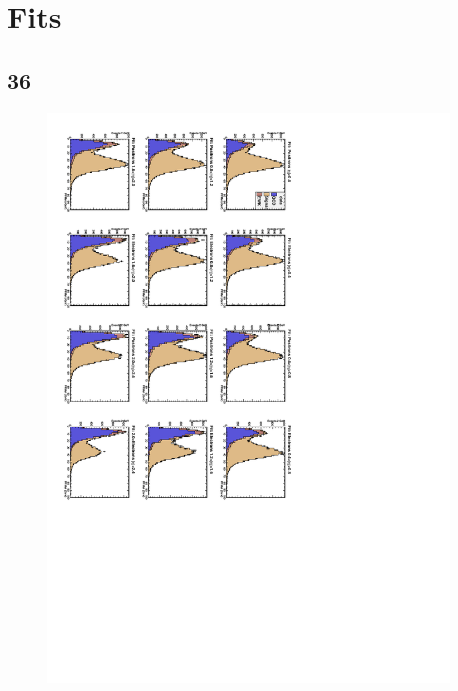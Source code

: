 \chapter{Fits}

\section{\unit{36}{\invpb}}

\begin{figure}
  \begin{center}
\includegraphics[trim = 80mm 100mm 0mm 0mm, clip, angle=90, width=0.95\textwidth]{Dec22_data}

\end{center}
\end{figure}
